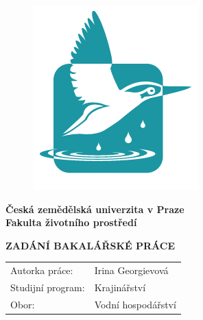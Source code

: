 \documentclass[usenames,dvipsnames,oneside,10.9pt]{article}
\begin{document}
\thispagestyle{empty}
\vspace*{-2.9cm}
\hspace*{-3cm}
\begin{minipage}[c]{0.25\textwidth}
\begin{figure}[H]
\centering
\includegraphics[width=\textwidth]{./fig/logo_fzp.png}
\end{figure}
\end{minipage}
\hspace*{9mm}
\begin{minipage}[c]{0.75\textwidth}
\bfseries{Česká zemědělská univerzita v Praze} \\

\bfseries{Fakulta životního prostředí}
\end{minipage}

\vspace*{0.15cm}

\centerline{\large \textbf{ZADÁNÍ BAKALÁŘSKÉ PRÁCE}}

\vspace*{0.6cm}

\hspace*{-3cm}
\begin{tabular}{ll}

\noalign{\vspace{2mm}}
Autorka práce: \hspace*{2.3cm} & Irina Georgievová \\
\noalign{\vspace{2.3mm}}
Studijní program: \hspace*{2.3cm} & Krajinářství \\
\noalign{\vspace{2mm}}
Obor: \hspace*{2.3cm} & Vodní hospodářství \\
\end{tabular}
\end{document}
